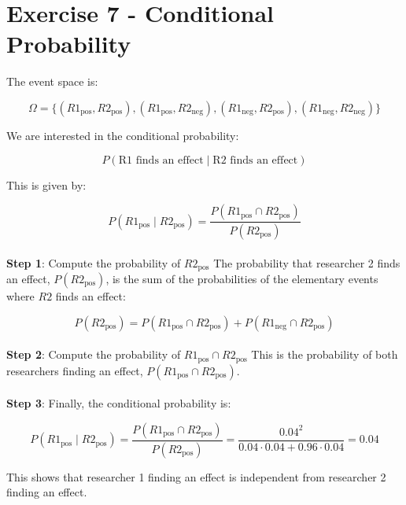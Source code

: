 \documentclass{article}
\begin{document}
\section*{Exercise 7 - Conditional Probability}

The event space is:

\[
\Omega = \{ (R1_{\text{pos}}, R2_{\text{pos}}), (R1_{\text{pos}}, R2_{\text{neg}}), (R1_{\text{neg}}, R2_{\text{pos}}), (R1_{\text{neg}}, R2_{\text{neg}}) \}
\]

We are interested in the conditional probability:

\[
P(\text{R1 finds an effect} \mid \text{R2 finds an effect})
\]

This is given by:

\[
P(R1_{\text{pos}} \mid R2_{\text{pos}}) = \frac{P(R1_{\text{pos}} \cap R2_{\text{pos}})}{P(R2_{\text{pos}})}
\]
\\
\textbf{Step 1}: Compute the probability of \( R2_{\text{pos}} \)
The probability that researcher 2 finds an effect, \( P(R2_{\text{pos}}) \), is the sum of the probabilities of the elementary events where \( R2 \) finds an effect:

\[
P(R2_{\text{pos}}) = P(R1_{\text{pos}} \cap R2_{\text{pos}}) + P(R1_{\text{neg}} \cap R2_{\text{pos}})
\]
\\
\textbf{Step 2}: Compute the probability of \( R1_{\text{pos}} \cap R2_{\text{pos}} \)
This is the probability of both researchers finding an effect, \( P(R1_{\text{pos}} \cap R2_{\text{pos}}) \).\\
\\
\textbf{Step 3}: Finally, the conditional probability is:

\[
P(R1_{\text{pos}} \mid R2_{\text{pos}}) = \frac{P(R1_{\text{pos}} \cap R2_{\text{pos}})}{P(R2_{\text{pos}})} = \frac{0.04^2}{0.04 \cdot 0.04 + 0.96 \cdot 0.04} = 0.04
\]

This shows that researcher 1 finding an effect is independent from researcher 2 finding an effect.
\end{document}
